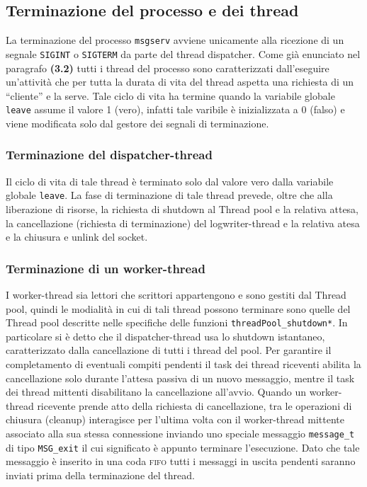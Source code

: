 \documentclass[a4paper,10pt]{article}
\begin{document}
\subsection{Terminazione del processo e dei thread}
La terminazione del processo \texttt{msgserv} avviene unicamente alla
ricezione di un segnale \texttt{SIGINT} o \texttt{SIGTERM} da parte
del thread dispatcher. Come gi\`a enunciato nel paragrafo
\textbf{(3.2)} tutti i thread del processo sono caratterizzati
dall'eseguire un'attivit\`a che per tutta la durata di vita del thread
aspetta una richiesta di un ``cliente'' e la serve. Tale ciclo di vita
ha termine quando la variabile globale \texttt{leave} assume il valore
1 (vero), infatti tale varibile \`e inizializzata a 0 (falso) e viene
modificata solo dal gestore dei segnali di terminazione.

\subsubsection{Terminazione del dispatcher-thread}
Il ciclo di vita di tale thread \`e terminato solo dal valore vero
dalla variabile globale \texttt{leave}. La fase di terminazione di
tale thread prevede, oltre che alla liberazione di risorse, la
richiesta di shutdown al Thread pool e la relativa attesa, la
cancellazione (richiesta di terminazione) del logwriter-thread e la
relativa atesa e la chiusura e unlink del socket.

\subsubsection{Terminazione di un worker-thread}
I worker-thread sia lettori che scrittori appartengono e sono gestiti
dal Thread pool, quindi le modialit\`a in cui di tali thread possono
terminare sono quelle del Thread pool descritte nelle specifiche delle
funzioni \texttt{threadPool\_shutdown*}. In particolare si \`e detto
che il dispatcher-thread usa lo shutdown istantaneo, caratterizzato
dalla cancellazione di tutti i thread del pool. Per garantire il
completamento di eventuali compiti pendenti il task dei thread
riceventi abilita la cancellazione solo durante l'attesa passiva di un
nuovo messaggio, mentre il task dei thread mittenti disabilitano la
cancellazione all'avvio. Quando un worker-thread ricevente prende atto
della richiesta di cancellazione, tra le operazioni di chiusura
(cleanup) interagisce per l'ultima volta con il worker-thread mittente
associato alla sua stessa connessione inviando uno speciale messaggio
\texttt{message\_t} di tipo \texttt{MSG\_exit} il cui significato \`e
appunto terminare l'esecuzione. Dato che tale messaggio \`e inserito
in una coda \textsc{fifo} tutti i messaggi in uscita pendenti saranno
inviati prima della terminazione del thread.
\end{document}
